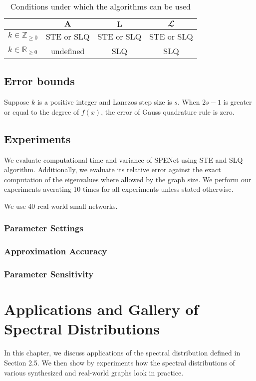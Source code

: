 \documentclass[senior,final,11pt]{iscs-thesis}
\begin{document}
\begin{table}[htb]
    \begin{center}
      \begin{tabular}{l| c c c }
       & ${\mathbf A}$ & ${\mathbf L}$ & ${\mathbfcal L}$ \\ \hline
        $k\in \mathbb{Z}_{\geq 0}$ & STE or SLQ  & STE or SLQ  & STE or SLQ \\
        $k\in \mathbb{R}_{\geq 0}$&  undefined  & SLQ  &  SLQ \\
      \end{tabular}
      \caption{Conditions under which the algorithms can be used}
      \label{tab:notion}
    \end{center}
  \end{table}

\section{Error bounds}
Suppose $k$ is a positive integer and Lanczos step size is $s$. When $2s-1$ is greater or equal to the degree of $f(x)$, the error of Gauss quadrature rule is zero.

\section{Experiments}
We evaluate computational time and variance of SPENet using STE and SLQ algorithm. Additionally, we evaluate its relative error against the exact computation of the eigenvalues where allowed by the graph size. We perform our experiments averating 10 times for all experiments unless stated otherwise.

We use 40 real-world small networks\cite{nr}.
\subsection{Parameter Settings}

\subsection{Approximation Accuracy}
\subsection{Parameter Sensitivity}




\chapter{Applications and Gallery of Spectral Distributions}
In this chapter, we discuss applications of the spectral distribution defined in Section 2.5. We then show by experiments how the spectral distributions of various synthesized and real-world graphs look in practice.
\end{document}
